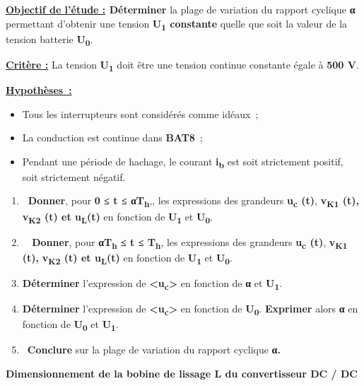 \textbf{\ul{Objectif de l'étude :} Déterminer} la plage de variation du rapport cyclique \textbf{α} permettant d'obtenir une tension \textbf{U\textsubscript{1} constante} quelle que soit la valeur de la tension batterie \textbf{U\textsubscript{0}}.

\textbf{\ul{Critère :}} La tension \textbf{U\textsubscript{1}} doit être une tension continue constante égale à \textbf{500 V}.

\textbf{\ul{Hypothèses~:}}

\begin{itemize}
\item
  Tous les interrupteurs sont considérés comme idéaux~;
\item
  La conduction est continue dans \textbf{BAT8}~;
\item
  Pendant une période de hachage, le courant \textbf{i\textsubscript{b}} est soit strictement positif, soit strictement négatif.
\end{itemize}

\begin{enumerate}
\def\labelenumi{\arabic{enumi}.}
\item
  \textbf{~Donner}, pour \textbf{0 ≤ t ≤ αT\textsubscript{h}},, les expressions des grandeurs \textbf{u\textsubscript{c} (t)}, \textbf{v\textsubscript{K1} (t),} \textbf{v\textsubscript{K2} (t) et u\textsubscript{L}(t)} en fonction de \textbf{U\textsubscript{1}} et \textbf{U\textsubscript{0}}.
\item
  \textbf{~ Donner}, pour \textbf{αT\textsubscript{h} ≤ t ≤ T\textsubscript{h}}, les expressions des grandeurs \textbf{u\textsubscript{c} (t)}, \textbf{v\textsubscript{K1} (t),} \textbf{v\textsubscript{K2} (t) et u\textsubscript{L}(t)} en fonction de \textbf{U\textsubscript{1}} et \textbf{U\textsubscript{0}}.
\item
  \textbf{Déterminer} l'expression de \textbf{\textless u\textsubscript{c}\textgreater{}} en fonction de \textbf{α} et \textbf{U\textsubscript{1}}.
\item
  \textbf{Déterminer} l'expression de \textbf{\textless u\textsubscript{c}\textgreater{}} en fonction de \textbf{U\textsubscript{0}}. \textbf{Exprimer} alors \textbf{α} en fonction de \textbf{U\textsubscript{0}} et \textbf{U\textsubscript{1}}.
\item
  ~\textbf{Conclure} sur la plage de variation du rapport cyclique \textbf{α.}
\end{enumerate}

\textbf{Dimensionnement de la bobine de lissage L du convertisseur DC / DC}

